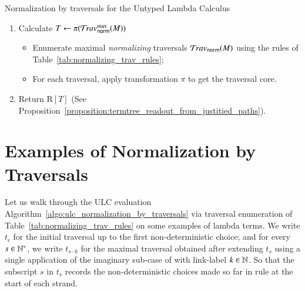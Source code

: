 \documentclass{elsarticle}
\theoremstyle{plain}
\theoremstyle{definition}
\newcommand{\normalizing}{{\sf norm}}
\newcommand{\travsetnorm}{\travset_\normalizing} %
\def\readout{\mathrm{R}} %
\def\coresymbol{\pi} %
\newcommand{\core}[1]{\coresymbol(#1)} %
\begin{document}
\begin{algorithm}%
\begin{algorithmic}
\caption{Normalization by traversals for the Untyped Lambda Calculus}
\label{algo:ulc_normalization_by_traversals}
\begin{enumerate}[nosep]
  \item Calculate $T \leftarrow \core{\travsetnorm^{\max}(M)}$
  \begin{itemize}[leftmargin=0.5em,nosep]
    \item Enumerate maximal \emph{normalizing} traversals $\travsetnorm(M)$ using the rules of Table~\ref{tab:normalizing_trav_rules};
    \item For each traversal, apply transformation $\coresymbol$ to get the traversal core.
  \end{itemize}
  \item Return $\readout[T]$ (See Proposition~\ref{proposition:termtree_readout_from_justitied_paths}).
\end{enumerate}
\end{algorithmic}
\end{algorithm}

\section{Examples of Normalization by Traversals}
\label{sec:examples}
Let us walk through the ULC evaluation Algorithm~\ref{algo:ulc_normalization_by_traversals} via traversal enumeration of Table~\ref{tab:normalizing_trav_rules} on some examples of lambda terms. We write $t_\epsilon$  for the initial traversal up to the first non-deterministic choice; and for every $s \in \mathbb{N}^*$, we write $t_{s \cdot k}$ for the maximal traversal obtained after extending $t_s$ using a single application of the imaginary sub-case of  with link-label $k \in \mathbb{N}$. So that the subscript $s$ in $t_s$ records the non-deterministic choices made so far in rule 
at the start of each strand.
\end{document}
